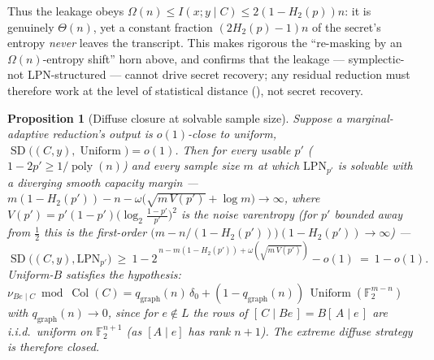 \documentclass[11pt,a4paper]{article}
\theoremstyle{plain}
\newtheorem{proposition}[theorem]{Proposition}
\theoremstyle{definition}
\newcommand{\F}{\mathbb{F}}
\begin{document}
Thus the leakage obeys $\Omega(n)\le I(x;y\mid C)\le 2(1-H_2(p))n$: it is genuinely $\Theta(n)$, yet a constant fraction $(2H_2(p)-1)n$ of the secret's entropy \emph{never} leaves the transcript. This makes rigorous the ``re-masking by an $\Omega(n)$-entropy shift'' horn above, and confirms that the leakage --- symplectic- not LPN-structured --- cannot drive secret recovery; any residual reduction must therefore work at the level of statistical distance (), not secret recovery.

\begin{proposition}[Diffuse closure at solvable sample size]
\label{prop:diffuse-solvable}
Suppose a marginal-adaptive reduction's output is $o(1)$-close to uniform, $\operatorname{SD}\bigl((C,y),\operatorname{Uniform}\bigr)=o(1)$. Then for every usable $p'$ ($1-2p'\ge1/\operatorname{poly}(n)$) and every sample size $m$ at which $\mathrm{LPN}_{p'}$ is solvable with a diverging \emph{smooth} capacity margin --- $m(1-H_2(p'))-n-\omega\bigl(\sqrt{m\,V(p')}+\log m\bigr)\to\infty$, where $V(p')=p'(1-p')\bigl(\log_2\tfrac{1-p'}{p'}\bigr)^2$ is the noise varentropy (for $p'$ bounded away from $\tfrac12$ this is the first-order $\bigl(m-n/(1-H_2(p'))\bigr)(1-H_2(p'))\to\infty$) ---
\[
\operatorname{SD}\bigl((C,y),\mathrm{LPN}_{p'}\bigr)\ \ge\ 1-2^{\,n-m(1-H_2(p'))+\omega(\sqrt{m\,V(p')})}-o(1)\ =\ 1-o(1).
\]
Uniform-$B$ satisfies the hypothesis: $\nu_{Be\mid C}\bmod\operatorname{Col}(C)=q_{\mathrm{graph}}(n)\,\delta_0+(1-q_{\mathrm{graph}}(n))\,\operatorname{Uniform}(\F_2^{m-n})$ with $q_{\mathrm{graph}}(n)\to0$, since for $e\notin L$ the rows of $[\,C\mid Be\,]=B[\,A\mid e\,]$ are i.i.d.\ uniform on $\F_2^{n+1}$ (as $[A\mid e]$ has rank $n+1$). The extreme diffuse strategy is therefore closed.
\end{proposition}
\end{document}

